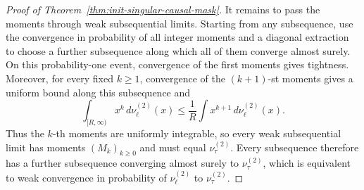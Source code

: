 \documentclass{article}
\theoremstyle{definition}
\theoremstyle{remark}
\begin{document}
\begin{proof}[Proof of Theorem~\ref{thm:init-singular-causal-mask}]
It remains to pass the moments through weak subsequential limits.  Starting
from any subsequence, use the convergence in probability of all integer
moments and a diagonal extraction to choose a further subsequence along which
all of them converge almost surely.  On this probability-one event, convergence
of the first moments gives tightness.  Moreover, for every fixed $k\geq1$,
convergence of the $(k+1)$-st moments gives a uniform bound along this
subsequence and
\[
    \int_{[R,\infty)}x^k\,d\nu_{\ell}^{(2)}(x)
    \leq
    \frac1R\int x^{k+1}\,d\nu_{\ell}^{(2)}(x).
\]
Thus the $k$-th moments are uniformly integrable, so every weak subsequential
limit has moments $(M_k)_{k\geq0}$ and must equal $\nu_{\tau}^{(2)}$.  Every
subsequence therefore has a further subsequence converging almost surely to
$\nu_{\tau}^{(2)}$, which is equivalent to weak convergence in probability of
$\nu_{\ell}^{(2)}$ to $\nu_{\tau}^{(2)}$.
\end{proof}
\end{document}
